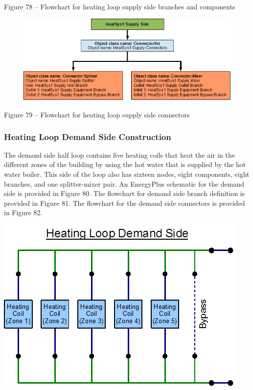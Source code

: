 Figure 78 -- Flowchart for heating loop supply side branches and components

\begin{figure}[htbp]
\centering
\includegraphics{media/image079.png}
\caption{}
\end{figure}

Figure 79 -- Flowchart for heating loop supply side connectors

\subsubsection{Heating Loop Demand Side Construction}\label{heating-loop-demand-side-construction}

The demand side half loop contains five heating coils that heat the air in the different zones of the building by using the hot water that is supplied by the hot water boiler. This side of the loop also has sixteen nodes, eight components, eight branches, and one splitter-mixer pair. An EnergyPlus schematic for the demand side is provided in Figure 80. The flowchart for demand side branch definition is provided in Figure 81. The flowchart for the demand side connectors is provided in Figure 82.

\textbf{\includegraphics{media/image080.png}}

